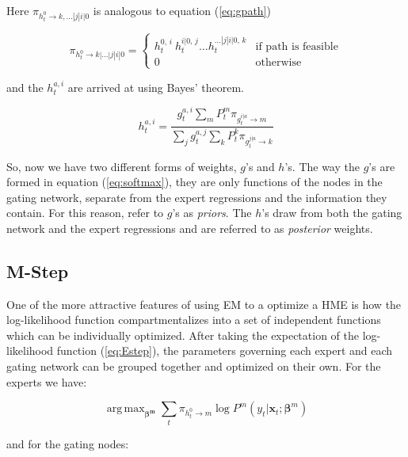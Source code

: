 \documentclass[12pt]{article}
\newcommand{\gateprod}[2]{\pi_{#1 \longrightarrow #2}}
\newcommand{\shortsum}[1]{\sum \nolimits_{#1}}
\newcommand{\h}[2]{h^{#1}_{#2}}
\DeclareMathOperator*{\argmax}{arg\,max}
\theoremstyle{definition}
\begin{document}
Here $\gateprod{h^{0}_{t}}{k,\dots|j|i|0}$ is analogous to equation (\ref{eq:gpath})

\begin{equation} \label{eq:hpath}
  \gateprod{h^{0}_{t}}{k|\ldots|j|i|0} =
    \begin{cases} 
       h^{0, \, i}_{t} \ h^{i|0, \, j}_{t} \ldots h^{\dots|j|i|0, \, k}_{t} & \textrm{if path is feasible} \\
       0 & \textrm{otherwise}
    \end{cases}
\end{equation}

and the $h^{a, i}_{t}$ are arrived at using Bayes' theorem.

\begin{equation} \label{eq:posteriornode}
  \h{a,i}{t} = \frac{g^{a, i}_{t} \shortsum{m} P^{m}_{t} \gateprod{g^{i|a}_{t}}{m}}{\shortsum{j} g^{a, j}_{t} \shortsum{k} P^{k}_{t} \gateprod{g^{j|a}_{t}}{k}}
\end{equation}


So, now we have two different forms of weights, $g$'s and $h$'s. The
way the $g$'s are formed in equation (\ref{eq:softmax}), they are only
functions of the nodes in the gating network, separate from the
expert regressions and the information they contain. For this reason,
\citet{JordanJacobs1993} refer to $g$'s as \textit{priors}.
The $h$'s draw from both the gating network and the expert regressions and
are referred to as \textit{posterior} weights.


\subsection{M-Step} \label{sec:Mstep}

One of the more attractive features of using EM to a optimize a
HME is how the log-likelihood function compartmentalizes into a set 
of independent functions which can be individually optimized. After
taking the expectation of the log-likelihood function (\ref{eq:Estep}), the
parameters governing each expert and each gating network can be grouped
together and optimized on their own. For the experts we have:

\begin{equation} \label{eq:BetaUpdate}
  \argmax_{\boldsymbol{\beta^{m}}} \sum_{t} \gateprod{h^{0}_{t}}{m} \log P^{m} (y_{t}| \boldsymbol{x}_{t}; \boldsymbol{\beta}^{m})
\end{equation}

and for the gating nodes:
\end{document}
